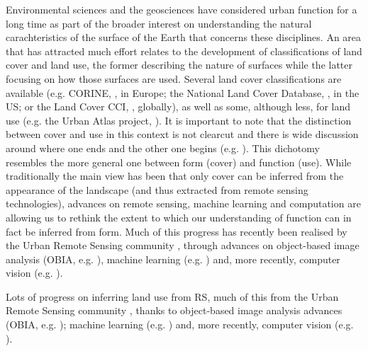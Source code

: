 Environmental sciences and the geosciences have considered urban function for a long time
as part of the broader interest on understanding the natural
carachteristics of the surface of the Earth that concerns these disciplines.
An area that has attracted much effort relates to the development of
classifications of land cover and land use, the former describing the nature of
surfaces while the latter focusing on how those surfaces are used. Several
land cover classifications are available (e.g. CORINE,
        \citealp{europeanenvironmentagency1990}, in Europe;
the National Land Cover Database, \citealp{homer2012national}, in the US; or
the Land Cover CCI, \citealp{defourny2012land}, globally), as well as some,
although less, for land use (e.g. the Urban Atlas project, \citealp{urban_atlas}).
%
It is important to note that the distinction between cover and use in this
context is not clearcut and there is wide discussion around where one ends and
the other one begins
(e.g. \citealp{fisher2005land, doi:10.1080/17474230802434187}).
This dichotomy resembles the more general one between form (cover) and
function (use).
While traditionally the main view has been that only cover can be
inferred from the appearance of the landscape (and thus extracted from remote
sensing technologies), advances on remote sensing, machine learning and
computation are allowing us to rethink the extent to which our understanding
of function can in fact be inferred from form.
Much of this progress has recently been realised by the Urban Remote Sensing community
\citep{weng2018urban}, through advances on object-based image
analysis (OBIA, e.g. \citealp{prasad2015remotely}), machine
learning (e.g. \citealp{kuffer2016slums, georganos2018very, JOCHEM2018104})
and, more recently, computer vision (e.g. \citealp{stark2020satellite,
geiss2020deep}).


Lots of progress on inferring land use from RS, much of this from the Urban
Remote Sensing community \citep{weng2018urban}, thanks to object-based image
analysis advances (OBIA, e.g. \citealp{prasad2015remotely}); machine
learning (e.g. \citealp{kuffer2016slums, georganos2018very, JOCHEM2018104})
and, more recently, computer vision (e.g. \citealp{stark2020satellite, geiss2020deep}).



